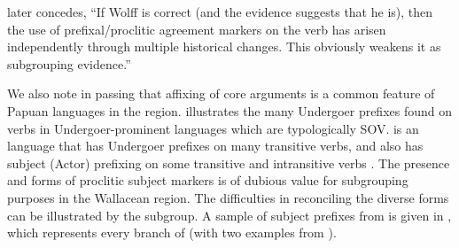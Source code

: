 \citet[59]{Blust2009} later concedes,
“If Wolff is correct (and the evidence suggests that he is),
then the use of prefixal/proclitic agreement markers on the verb
has arisen independently through multiple historical changes.
This obviously weakens it as subgrouping evidence.”

We also note in passing that affixing of core arguments is a
common feature of Papuan languages in the region.
\citet{Klamer2017} illustrates the many Undergoer prefixes found
on verbs in Undergoer-prominent  languages which are typologically SOV.
 is an  language that has Undergoer prefixes
on many transitive verbs,
and also has subject (Actor) prefixing on some transitive
and intransitive verbs \citep{Jones2023}. 
The presence and forms of proclitic subject markers is of dubious
value for subgrouping purposes in the Wallacean region.
The difficulties in reconciling the diverse forms can be illustrated
by the  subgroup.
A sample of subject prefixes from  is given
in , which represents every branch of  (with two
examples from ).

